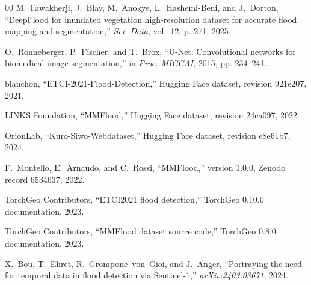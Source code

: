 \documentclass[conference]{IEEEtran}
\begin{document}
\begin{thebibliography}{00}
M.~Fawakherji, J.~Blay, M.~Anokye, L.~Hashemi-Beni, and J.~Dorton, ``DeepFlood for inundated vegetation high-resolution dataset for accurate flood mapping and segmentation,'' \emph{Sci. Data}, vol.~12, p. 271, 2025.

O.~Ronneberger, P.~Fischer, and T.~Brox, ``U-Net: Convolutional networks for biomedical image segmentation,'' in \emph{Proc. MICCAI}, 2015, pp. 234--241.

blanchon, ``ETCI-2021-Flood-Detection,'' Hugging Face dataset, revision 921e207, 2021.

LINKS Foundation, ``MMFlood,'' Hugging Face dataset, revision 24ca097, 2022.

OrionLab, ``Kuro-Siwo-Webdataset,'' Hugging Face dataset, revision e8e61b7, 2024.

F.~Montello, E.~Arnaudo, and C.~Rossi, ``MMFlood,'' version 1.0.0, Zenodo record 6534637, 2022.

TorchGeo Contributors, ``ETCI2021 flood detection,'' TorchGeo 0.10.0 documentation, 2023.

TorchGeo Contributors, ``MMFlood dataset source code,'' TorchGeo 0.8.0 documentation, 2023.

X.~Bou, T.~Ehret, R.~Grompone~von~Gioi, and J.~Anger, ``Portraying the need for temporal data in flood detection via Sentinel-1,'' \emph{arXiv:2403.03671}, 2024.

\end{thebibliography}
\end{document}
